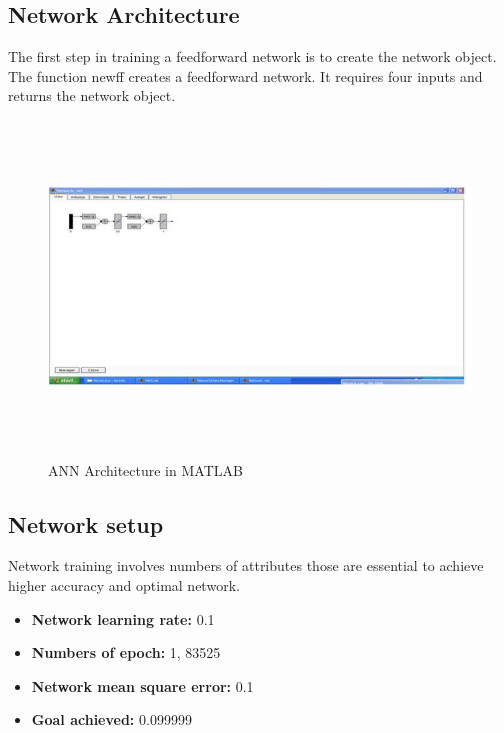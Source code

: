 \documentclass[a4paper,14pt,onecolumn]{article}
\begin{document}
\subsection{Network Architecture}
The first step in training a feedforward network is to create the network object. The function newff creates a feedforward network. It requires four inputs and returns the network object.
\begin{figure}[h!]
\begin{center}
\includegraphics[height=3.5in,width=5.5in]
{NNArchi.jpg} 
\caption{ANN Architecture in MATLAB}
\end{center}
\end{figure}

\subsection{Network setup}
Network training involves numbers of attributes those are essential to achieve higher accuracy and optimal network.
\begin{itemize}
\item \textbf{Network learning rate:}            0.1
\item \textbf{Numbers of epoch:}                   1, 83525
\item \textbf{Network mean square error:}   0.1
\item \textbf{Goal achieved:}                           0.099999
\end{itemize}

\newpage
\end{document}
